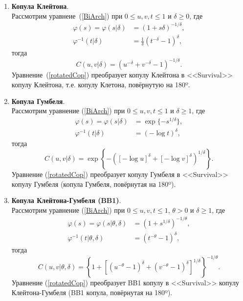 \begin{enumerate}
\item \textbf{Копула Клейтона}.\\
Рассмотрим уравнеие~(\ref{BiArch}) при $0 \le u,v,t \le 1$ и $\delta \ge 0$, где
\begin{equation}
\begin{aligned}
    \varphi (s) = \varphi(s| \delta) &= (1 + s \delta)^{-1/\delta}, \\ 
    \varphi^{-1}(t| \delta) &= \frac{1}{\delta} (t^{-\delta} - 1)^\delta,
\end{aligned} \nonumber 
\end{equation}
тогда
\begin{equation}
    C(u,v|\delta) = (u^{-\delta} + v^{-\delta} - 1)^{-1/\delta}. \nonumber
\end{equation}
Уравнение~(\ref{rotatedCop}) преобразует копулу Клейтона в <<Survival>> копулу Клейтона, т.е. копулу Клетона, повёрнутую на 180º.

\item \textbf{Копула Гумбеля}.\\
Рассмотрим уравнение (\ref{BiArch}) при $0 \le u,v,t \le 1$ и $\delta \ge 1$, где
\begin{equation}
\begin{aligned}
    \varphi (s) = \varphi(s| \delta) &= \exp{\{-s^{1/\delta}\}}, \\ 
    \varphi^{-1}(t| \delta) &= (-\log{t})^\delta,
\end{aligned} \nonumber 
\end{equation}
тогда
\begin{equation}
    C(u,v|\delta) = \exp{\left\{-([-\log{u}]^\delta + [-\log{v}]^\delta)^{1/\delta}\right\}}. \nonumber
\end{equation}
Уравнение (\ref{rotatedCop}) преобразует копулу Гумбеля в <<Survival>> копулу Гумбеля (копула Гумбеля, повёрнутая на 180º). 

\item \textbf{Копула Клейтона-Гумбеля (BB1)}.\\
Рассмотрим уравнение (\ref{BiArch}) при $0 \le u,v,t \le 1$, $\theta > 0$ и $\delta \ge 1$, где
\begin{equation}
\begin{aligned}
    \varphi (s) = \varphi(s| \theta, \delta) &= (1 + s^{1/\delta})^{-1/\theta}, \\ 
    \varphi^{-1}(t| \theta, \delta) &= (t^{-\theta} - 1)^\delta,
\end{aligned} \nonumber 
\end{equation}
тогда
\begin{equation}
    C(u,v|\theta,\delta) = \left\{1 + [(u^{-\theta} - 1)^\delta + (v^{-\theta} - 1)^\delta]^{1/\delta} \right\}^{-1/\theta}. \nonumber
\end{equation}
Уравнение (\ref{rotatedCop}) преобразует BB1 копулу в  <<Survival>> копулу Клейтона-Гумбеля (BB1 копула, повёрнутая на 180º).


\end{enumerate}
